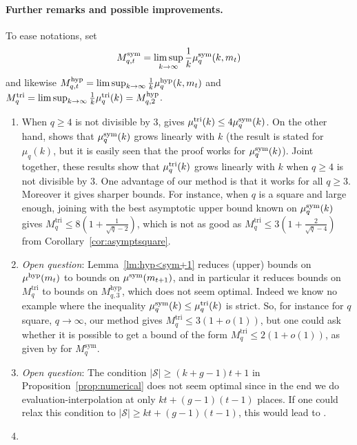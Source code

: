 \documentclass[11pt]{article}
\begin{document}
\paragraph{Further remarks and possible improvements.}
To ease notations, set \[ M^{\textrm{sym}}_{q,t}=\limsup_{k\to\infty}\frac{1}{k}\mu^{\textrm{sym}}_q(k,m_t) \]
and likewise $M^{\textrm{hyp}}_{q,t}=\limsup_{k\to\infty}\frac{1}{k}\mu^{\textrm{hyp}}_q(k,m_t)$ and $M^{\textrm{tri}}_q=\limsup_{k\to\infty}\frac{1}{k}\mu^{\textrm{tri}}_q(k)=M^{\textrm{hyp}}_{q,2}$.
\begin{enumerate}
\item When $q\geq4$ is not divisible by $3$, \cite[Thm.~2]{SL84} gives $\mu^{\textrm{tri}}_q(k)\leq 4\mu^{\textrm{sym}}_q(k)$.
On the other hand, \cite{CC88} shows that $\mu^{\textrm{sym}}_q(k)$ grows linearly with $k$ (the result is stated for $\mu_q(k)$,
but it is easily seen that the proof works for $\mu^{\textrm{sym}}_q(k)$). Joint together, these results show that $\mu^{\textrm{tri}}_q(k)$ grows linearly with $k$
when $q\geq4$ is not divisible by $3$. One advantage of our method is that it works for all $q\geq3$.
Moreover it gives sharper bounds. For instance, when $q$ is a square and large enough, joining \cite[Thm.~2]{SL84} with the best asymptotic upper bound known on $\mu^{\textrm{sym}}_q(k)$ \cite[Thm.~6.4]{Randriam12} gives $M^{\textrm{tri}}_q\leq 8\left(1+\frac{1}{\sqrt{q}-2}\right)$,
which is not as good as $M^{\textrm{tri}}_q\leq 3\left(1+\frac{2}{\sqrt{q}-4}\right)$ from Corollary~\ref{cor:asymptsquare}.
\item \emph{Open question}: Lemma~\ref{lm:hyp<sym+1} reduces (upper) bounds on $\mu^{\textrm{hyp}}(m_t)$ to bounds on $\mu^{\textrm{sym}}(m_{t+1})$,
and in particular it reduces bounds on $M^{\textrm{tri}}_q$ to bounds on $M^{\textrm{hyp}}_{q,3}$, which does not seem optimal.
Indeed we know no example where the inequality $\mu^{\textrm{sym}}_q(k)\leq\mu^{\textrm{tri}}_q(k)$ is strict.
So, for instance for $q$ square, $q\to\infty$, our method gives $M^{\textrm{tri}}_q\leq 3(1+o(1))$,
but one could ask whether it is possible to get a bound of the form $M^{\textrm{tri}}_q\leq 2(1+o(1))$,
as given by \cite[Thm.~6.4]{Randriam12} for $M^{\textrm{sym}}_q$.
\item \emph{Open question}: The condition $|\mathcal{S}|\geq (k+g-1)t+1$ in Proposition~\ref{prop:numerical}
does not seem optimal since in the end we do evaluation-interpolation at only $kt+(g-1)(t-1)$ places.
If one could relax this condition to $|\mathcal{S}|\geq kt+(g-1)(t-1)$, this would lead to
\cite{Randriam12}\cite{Randriam19}\cite{Randriam13}.
\item \cite{BR04}\cite{Randriam12}\cite{CCXY12}\cite{BBRR20+}
\end{enumerate}



\end{document}
